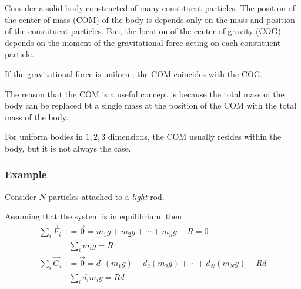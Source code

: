 \documentclass[12pt]{article}
\begin{document}
Consider a solid body constructed
of many constituent particles.
The position of the center of mass (COM)
of the body is depends only on the 
mass and position of the constituent particles.
But, the location of the center of gravity (COG)
depends on the moment of the gravitational force
acting on each constituent particle.

If the gravitational force is uniform,
the COM coincides with the COG.

The reason that the COM is a useful concept
is because the total mass of the body
can be replaced bt a single mass at the position
of the COM with the total mass of the body.

For uniform bodies in $1,2,3$ dimensions, 
the COM usually resides within the body,
but it is not always the case.

\subsubsection*{Example}

Consider $N$ particles attached to a \emph{light} rod.

\begin{center}
\end{center}

Assuming that the system is in equilibrium, then
\begin{align*}
    \sum_{i}\vec{F}_i &= \vec{0} = m_{1}g + m_{2}g + \cdots + m_n g - R = 0 \\
                      &\sum_{i} m_i g = R\\
    \sum_{i} \vec{G}_i &= \vec{0} = d_{1}(m_{1}g) + d_{2}(m_{2}g) + \cdots + d_N(m_N g) - Rd\\
                       &\sum_{i} d_i m_i g = Rd
\end{align*}
\end{document}
